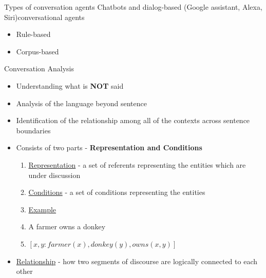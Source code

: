 \begin{frame}{Types of conversation agents}
      Chatbots and dialog-based (Google assistant, Alexa, Siri)conversational agents
    \begin{itemize}
        \item Rule-based
        \item Corpus-based
    \end{itemize}
\end{frame}
\begin{frame}{Conversation Analysis}

\begin{itemize}
\item Understanding what is \textbf{NOT }said
\item Analysis of the language beyond sentence
\item Identification of the relationship among all of the contexts across sentence boundaries
\item Consists of two parts - 	\textbf{Representation and Conditions}
\begin{enumerate}
	\item \underline{Representation} - a set of referents representing the entities which are under discussion
	\item \underline{Conditions} - a set of conditions representing the entities
	\item[] \underline{Example}
	\item[] A farmer owns a donkey
	\item[] $\left[ x,y:farmer(x),donkey(y), owns(x,y)\right]$
\end{enumerate}
\item \underline{Relationship} - how two segments of discourse are logically connected to each other
\end{itemize}

\end{frame}

%


